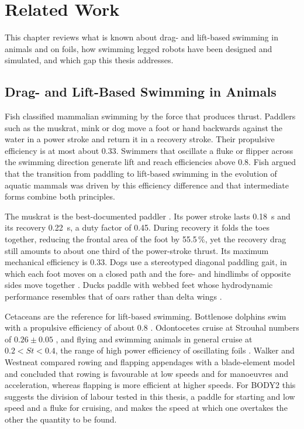 \chapter{Related Work}
\label{ch:related}

This chapter reviews what is known about drag- and lift-based swimming in animals and on foils, how swimming
legged robots have been designed and simulated, and which gap this thesis addresses.

\section{Drag- and Lift-Based Swimming in Animals}
\label{sec:rw-bio}

Fish \cite{Fish1996} classified mammalian swimming by the force that produces thrust. Paddlers such as the
muskrat, mink or dog move a foot or hand backwards against the water in a power stroke and return it in a
recovery stroke. Their propulsive efficiency is at most about 0.33. Swimmers that oscillate a fluke or flipper
across the swimming direction generate lift and reach efficiencies above 0.8. Fish argued that the transition
from paddling to lift-based swimming in the evolution of aquatic mammals was driven by this efficiency
difference and that intermediate forms combine both principles.

The muskrat is the best-documented paddler \cite{Fish1984}. Its power stroke lasts \SI{0.18}{\second} and
its recovery \SI{0.22}{\second}, a duty factor of 0.45. During recovery it folds the toes together, reducing
the frontal area of the foot by 55.5\,\%, yet the recovery drag still amounts to about one third of the
power-stroke thrust. Its maximum mechanical efficiency is 0.33. Dogs use a stereotyped diagonal paddling
gait, in which each foot moves on a closed path and the fore- and hindlimbs of opposite sides move together
\cite{Fish2021DogPaddle}. Ducks paddle with webbed feet whose hydrodynamic performance resembles that of oars
rather than delta wings \cite{Ribak2023}.

Cetaceans are the reference for lift-based swimming. Bottlenose dolphins swim with a propulsive efficiency
of about 0.8 \cite{Fish1993}. Odontocetes cruise at Strouhal numbers of $0.26\pm0.05$ \cite{Rohr2004}, and
flying and swimming animals in general cruise at $0.2<\mathit{St}<0.4$, the range of high power efficiency of
oscillating foils \cite{Taylor2003}. Walker and Westneat \cite{Walker2000} compared rowing and flapping
appendages with a blade-element model and concluded that rowing is favourable at low speeds and for
manoeuvres and acceleration, whereas flapping is more efficient at higher speeds. For BODY2 this suggests the division of
labour tested in this thesis, a paddle for starting and low speed and a fluke for cruising, and makes the speed at which one
overtakes the other the quantity to be found.


